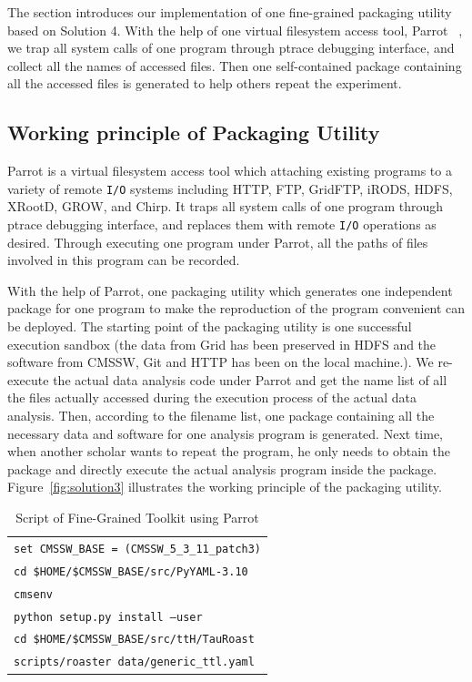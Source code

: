 \documentclass{sig-alternate}
\begin{document}
The section introduces our implementation of one fine-grained packaging utility based on Solution 4. With the help of one
virtual filesystem access tool, Parrot ~\cite{thain2005parrot}, we trap all system calls of one
program through ptrace debugging interface, and collect all the names of accessed files. 
Then one self-contained package containing all the accessed files is generated to help others repeat the experiment.

\subsection{Working principle of Packaging Utility} 

Parrot is a virtual filesystem access tool which attaching existing programs to
a variety of remote {\tt I/O} systems including 
HTTP, FTP, GridFTP, iRODS, HDFS, XRootD, GROW, and Chirp. It traps all system calls of one program through ptrace
debugging interface, and replaces them with remote {\tt I/O} operations as desired.
Through executing one program under Parrot, all the paths of files involved in
this program can be recorded.  

With the help of Parrot, one packaging utility which generates one independent
package for one program to make the reproduction of the program convenient can
be deployed. The starting point of the packaging utility is one successful execution
sandbox (the data from Grid has been preserved in HDFS and the software from
CMSSW, Git and HTTP has been on the local machine.). We re-execute the actual
data analysis code under Parrot and get the name list of all the files actually
accessed during the execution process of the actual data analysis. Then,
according to the filename list, one package containing all the necessary data
and software for one analysis program is generated. Next time, when another
scholar wants to repeat the program, he only needs to obtain the package and
directly execute the actual analysis program inside the package. 
Figure~\ref{fig:solution3} illustrates the working principle of the packaging utility.

\begin{table}
    \centering
    \begin{tabular}{|l|}
        \hline
        {\tt set CMSSW\_BASE = (CMSSW\_5\_3\_11\_patch3)} \\
        {\tt cd \$HOME/\$CMSSW\_BASE/src/PyYAML-3.10}\\
        {\tt cmsenv} \\
        {\tt python setup.py install --user} \\
        {\tt cd \$HOME/\$CMSSW\_BASE/src/ttH/TauRoast}\\
        {\tt scripts/roaster data/generic\_ttl.yaml} \\
        \hline
    \end{tabular}
    \caption{Script of Fine-Grained Toolkit using Parrot}
    \label{table:parrot-script}
\end{table}
\end{document}
